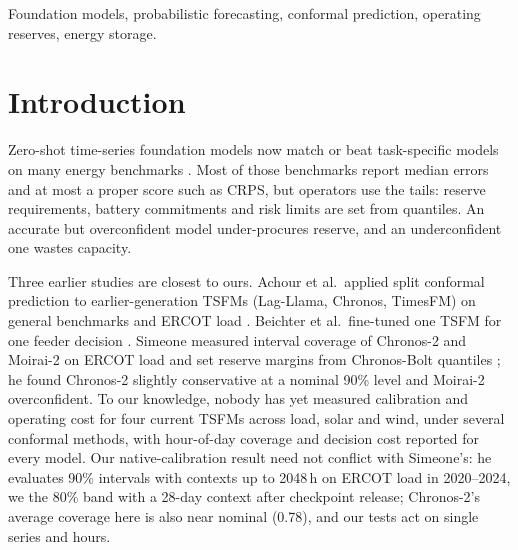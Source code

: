 \documentclass[conference]{IEEEtran}
\begin{document}
\begin{IEEEkeywords}
Foundation models, probabilistic forecasting, conformal prediction, operating reserves, energy storage.
\end{IEEEkeywords}

\section{Introduction}
Zero-shot time-series foundation models now match or beat task-specific models on many energy benchmarks \cite{prior_ercot_tsfm,prior_fets,prior_consumer}. Most of those benchmarks report median errors and at most a proper score such as CRPS, but operators use the tails: reserve requirements, battery commitments and risk limits are set from quantiles. An accurate but overconfident model under-procures reserve, and an underconfident one wastes capacity.

Three earlier studies are closest to ours. Achour et al.\ applied split conformal prediction to earlier-generation TSFMs (Lag-Llama, Chronos, TimesFM) on general benchmarks and ERCOT load \cite{prior_conformal_ercot}. Beichter et al.\ fine-tuned one TSFM for one feeder decision \cite{prior_dfl}. Simeone measured interval coverage of Chronos-2 and Moirai-2 on ERCOT load and set reserve margins from Chronos-Bolt quantiles \cite{prior_consumer}; he found Chronos-2 slightly conservative at a nominal 90\% level and Moirai-2 overconfident. To our knowledge, nobody has yet measured calibration and operating cost for four current TSFMs across load, solar and wind, under several conformal methods, with hour-of-day coverage and decision cost reported for every model. Our native-calibration result need not conflict with Simeone's: he evaluates 90\% intervals with contexts up to 2048\,h on ERCOT load in 2020--2024, we the 80\% band with a 28-day context after checkpoint release; Chronos-2's average coverage here is also near nominal (0.78), and our tests act on single series and hours.
\end{document}
